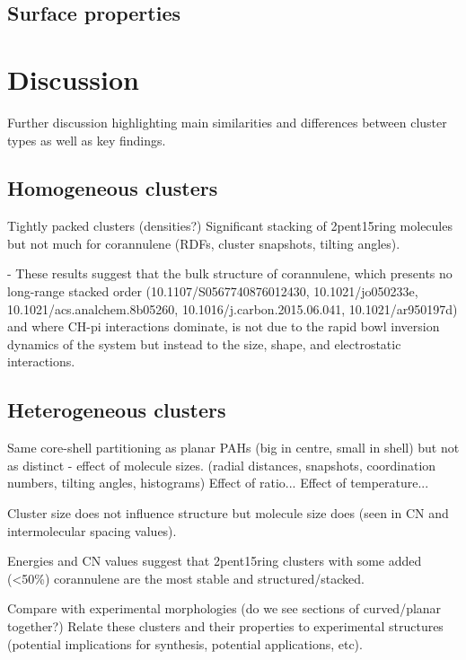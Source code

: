 \subsection{Surface properties}



\section{Discussion}
Further discussion highlighting main similarities and differences between cluster types as well as key findings.

\subsection{Homogeneous clusters}
Tightly packed clusters (densities?)
Significant stacking of 2pent15ring molecules but not much for corannulene (RDFs, cluster snapshots, tilting angles).

- These results suggest that the bulk structure of corannulene, which presents no long-range stacked order (10.1107/S0567740876012430, 10.1021/jo050233e, 10.1021/acs.analchem.8b05260, 10.1016/j.carbon.2015.06.041, 10.1021/ar950197d) and where CH-pi interactions dominate, is not due to the rapid bowl inversion dynamics of the system but instead to the size, shape, and electrostatic interactions.

\subsection{Heterogeneous clusters}
Same core-shell partitioning as planar PAHs (big in centre, small in shell) but not as distinct - effect of molecule sizes. (radial distances, snapshots, coordination numbers, tilting angles, histograms)
Effect of ratio...
Effect of temperature...

Cluster size does not influence structure but molecule size does (seen in CN and intermolecular spacing values).

Energies and CN values suggest that 2pent15ring clusters with some added (<50\%) corannulene are the most stable and structured/stacked.

Compare with experimental morphologies (do we see sections of curved/planar together?)
Relate these clusters and their properties to experimental structures (potential implications for synthesis, potential applications, etc).

